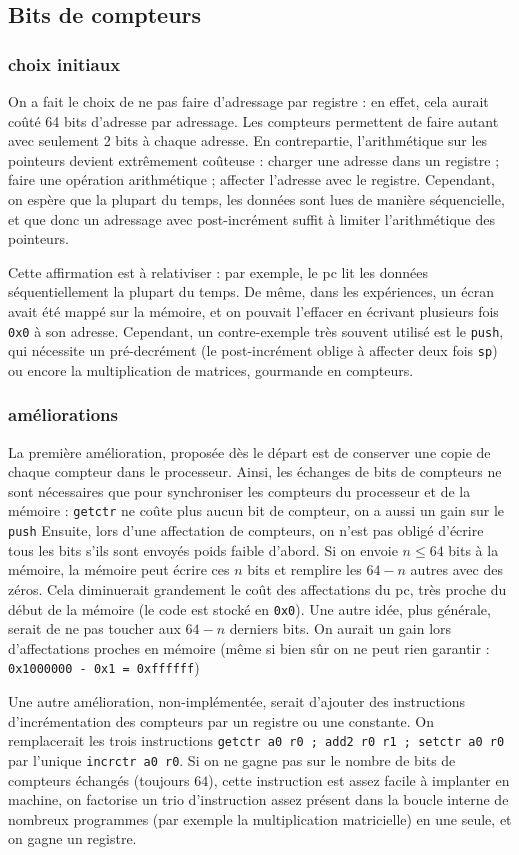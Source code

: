 \documentclass[architecture]{compas2018}
\begin{document}
\subsection{Bits de compteurs}
\subsubsection{choix initiaux}
On a fait le choix de ne pas faire d'adressage par registre : en effet, cela aurait coûté 64 bits d'adresse par adressage. Les compteurs permettent de faire autant avec seulement 2 bits à chaque adresse. En contrepartie, l'arithmétique sur les pointeurs devient extrêmement coûteuse : charger une adresse dans un registre ; faire une opération arithmétique ; affecter l'adresse avec le registre. Cependant, on espère que la plupart du temps, les données sont lues de manière séquencielle, et que donc un adressage avec post-incrément suffit à limiter l'arithmétique des pointeurs.\par
Cette affirmation est à relativiser : par exemple, le pc lit les données séquentiellement la plupart du temps. De même, dans les expériences, un écran avait été mappé sur la mémoire, et on pouvait l'effacer en écrivant plusieurs fois \texttt{0x0} à son adresse. Cependant, un contre-exemple très souvent utilisé est le \texttt{push}, qui nécessite un pré-decrément (le post-incrément oblige à affecter deux fois \texttt{sp}) ou encore la multiplication de matrices, gourmande en compteurs.
\subsubsection{améliorations}
La première amélioration, proposée dès le départ est de conserver une copie de chaque compteur dans le processeur. Ainsi, les échanges de bits de compteurs ne sont nécessaires que pour synchroniser les compteurs du processeur et de la mémoire : \texttt{getctr} ne coûte plus aucun bit de compteur, on a aussi un gain sur le \texttt{push}
Ensuite, lors d'une affectation de compteurs, on n'est pas obligé d'écrire tous les bits s'ils sont envoyés poids faible d'abord. Si on envoie $n\leqslant 64$ bits à la mémoire, la mémoire peut écrire ces $n$ bits et remplire les $64-n$ autres avec des zéros. Cela diminuerait grandement le coût des affectations du pc, très proche du début de la mémoire (le code est stocké en \texttt{0x0}). Une autre idée, plus générale, serait de ne pas toucher aux $64-n$ derniers bits. On aurait un gain lors d'affectations proches en mémoire (même si bien sûr on ne peut rien garantir : \texttt{0x1000000 - 0x1 = 0xffffff})\par
Une autre amélioration, non-implémentée, serait d'ajouter des instructions d'incrémentation des compteurs par un registre ou une constante. On remplacerait les trois instructions \texttt{getctr a0 r0 ; add2 r0 r1 ; setctr a0 r0} par l'unique \texttt{incrctr a0 r0}. Si on ne gagne pas sur le nombre de bits de compteurs échangés (toujours $64$), cette instruction est assez facile à implanter en machine, on factorise un trio d'instruction assez présent dans la boucle interne de nombreux programmes (par exemple la multiplication matricielle) en une seule, et on gagne un registre.
\end{document}
